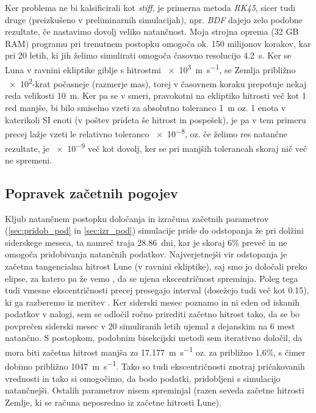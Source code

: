 \documentclass{article}
\begin{document}
Ker problema ne bi kalsificirali kot \textit{stiff}, je primerna metoda \textit{RK45}, sicer tudi druge (preizkušeno v preliminarnih simulacijah), npr. \textit{BDF} dajejo zelo podobne rezultate, če nastavimo dovolj veliko natančnost.
Moja strojna oprema (32 GB RAM) programu pri trenutnem postopku omogoča ok. 150 milijonov korakov, kar pri 20 letih, ki jih želimo simulirati omogoča časovno resolucijo \SI{4,2}{\second}. Ker se Luna v ravnini ekliptike giblje s hitrostmi \SI{e3}{\meter\per\second}, se Zemlja približno \SI{e2}{}-krat počasneje (razmerje mas), torej v časovnem koraku prepotuje nekaj reda velikosti \SI{10}{\meter}. Ker pa se v smeri, pravokotni na ekliptiko hitrosti več kot 1 red manjše, bi bilo smiselno vzeti za absolutno toleranco \SI{1}{\meter} oz. 1 enota v katerikoli SI enoti (v poštev prideta še hitrost in pospešek), je pa v tem primeru precej lažje vzeti le relativno toleranco \SI{e-8}{}, oz. če želimo res natančne rezultate, je \SI{e-9}{} več kot dovolj, ker se pri manjših tolerancah skoraj nič več ne spremeni.

\subsection{Popravek začetnih pogojev}

Kljub natančnem postopku določanja in izračuna začetnih parametrov (\ref{sec:pridob_pod} in \ref{sec:izr_pod}) simulacije pride do odstopanja že pri dolžini siderskege meseca, ta namreč traja \SI{28,86}{dni}, kar je skoraj 6\% preveč in ne omogoča pridobivanja natančnih podatkov. Najverjetnejši vir odstopanja je začetna tangencialna hitrost Lune (v ravnini ekliptike), saj smo jo določali preko elipse, za katero pa že vemo \cite{NASA:Lunar_orbit}, da se njena ekscentričnost spreminja. Poleg tega tudi vmesne ekscentričnosti precej presegajo interval (dosežejo tudi več kot \SI{0,15}{}), ki ga razberemo iz meritev \cite{NASA:Lunar_orbit}. Ker siderski mesec poznamo in ni eden od iskanih podatkov v nalogi, sem se odločil ročno prirediti začetno hitrost tako, da se bo povprečen siderski mesec v 20 simuliranih letih ujemal z dejanskim na 6 mest natančno. S postopkom, podobnim bisekcijski metodi sem iterativno določil, da mora biti začetna hitrost manjša za \SI{17,177}{\meter\per\second} oz. za približno {1,6}\%, s čimer dobimo približno \SI{1047}{\meter\per\second}. Tako so tudi ekscentričnosti znotraj pričakovanih vrednosti in tako si omogočimo, da bodo podatki, pridobljeni s simulacijo natančnejši. Ostalih parametrov nisem spreminjal (razen seveda začetne hitrosti Zemlje, ki se računa neposredno iz začetne hitrosti Lune).
\end{document}
